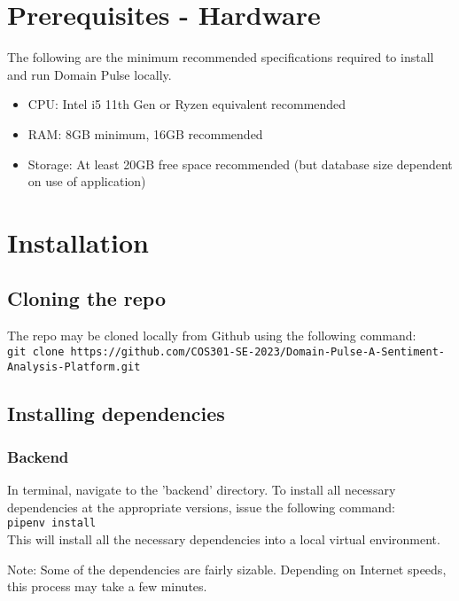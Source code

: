 \documentclass{article}
\newcommand{\code}[1]{\colorbox{light-gray}{\texttt{#1}}}
\begin{document}
\section{Prerequisites - Hardware}
The following are the minimum recommended specifications required to install and run Domain Pulse locally.
\begin{itemize}
    \item CPU: Intel i5 11th Gen or Ryzen equivalent recommended
    \item RAM: 8GB minimum, 16GB recommended
    \item Storage: At least 20GB free space recommended (but database size dependent on use of application)
\end{itemize}


\section{Installation}

\subsection{Cloning the repo}
The repo may be cloned locally from Github using the following command: \\
\code{git clone https://github.com/COS301-SE-2023/Domain-Pulse-A-Sentiment-Analysis-Platform.git}



\subsection{Installing dependencies}
\subsubsection{Backend}
In terminal, navigate to the 'backend' directory. To install all necessary dependencies at the appropriate versions, issue the following
command: \\
\code{pipenv install}\\
This will install all the necessary dependencies into a local virtual environment.

Note: Some of the dependencies are fairly sizable. Depending on Internet speeds, this process may take a few minutes.
\end{document}
